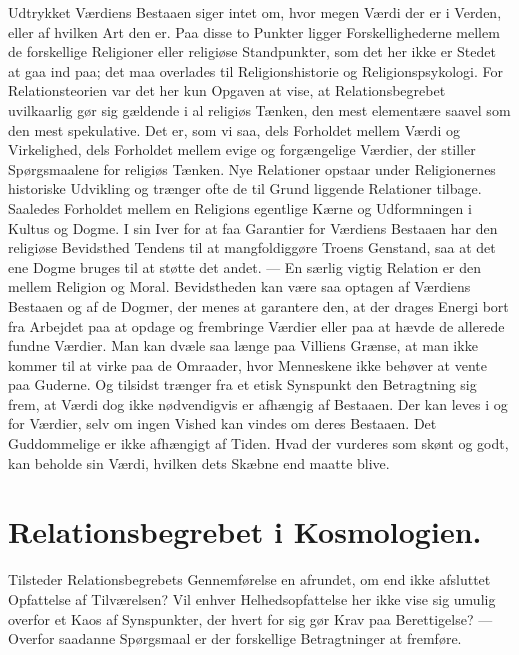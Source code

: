 \documentclass[12pt]{article}
\newcommand{\opage}[1]{\marginnote{\footnotesize\textit{[#1]}}}
\begin{document}
Udtrykket \guillemotright Værdiens Bestaaen\guillemotleft{} siger intet
om, hvor megen Værdi der er i Verden, eller af hvilken Art den er. Paa
disse to Punkter ligger Forskellighederne mellem de
\opage{98} forskellige Religioner eller religiøse Standpunkter, som det her ikke
er Stedet at gaa ind paa; det maa overlades til Religionshistorie og
Religionspsykologi. For Relationsteorien var det her kun Opgaven at
vise, at Relationsbegrebet uvilkaarlig gør sig gældende i al religiøs
Tænken, den mest elementære saavel som den mest spekulative. Det er,
som vi saa, dels Forholdet mellem Værdi og Virkelighed, dels Forholdet
mellem evige og forgængelige Værdier, der stiller Spørgsmaalene for
religiøs Tænken. Nye Relationer opstaar under Religionernes historiske
Udvikling og trænger ofte de til Grund liggende Relationer tilbage.
Saaledes Forholdet mellem en Religions egentlige Kærne og
Udformningen i Kultus og Dogme. I sin Iver for at faa Garantier for
Værdiens Bestaaen har den religiøse Bevidsthed Tendens til at
mangfoldiggøre Troens Genstand, saa at det ene Dogme bruges til at
støtte det andet. --- En særlig vigtig Relation er den mellem Religion
og Moral. Bevidstheden kan være saa optagen af Værdiens Bestaaen og af
de Dogmer, der menes at garantere den, at der drages Energi bort fra
Arbejdet paa at opdage og frembringe Værdier eller paa at hævde de
allerede fundne Værdier. Man kan dvæle saa længe paa Villiens Grænse,
at man ikke kommer til at virke paa de Omraader, hvor Menneskene ikke
behøver at vente paa Guderne. Og tilsidst trænger fra et etisk
Synspunkt den Betragtning sig frem, at Værdi dog ikke nødvendigvis er
afhængig af Bestaaen. Der kan leves i og for Værdier, selv om ingen
Vished kan vindes om deres Bestaaen. Det Guddommelige er ikke
afhængigt af Tiden. Hvad der vurderes som skønt og godt, kan beholde
sin Værdi, hvilken dets Skæbne end maatte blive.



\opage{99} \section{Relationsbegrebet i Kosmologien.}\label{sec:5}
Tilsteder Relationsbegrebets Gennemførelse en afrundet, om end ikke
afsluttet Opfattelse af Tilværelsen? Vil enhver Helhedsopfattelse her ikke
vise sig umulig overfor et Kaos af Synspunkter, der hvert for sig gør Krav
paa Berettigelse? --- Overfor saadanne Spørgsmaal er der forskellige
Betragtninger at fremføre.
\end{document}
